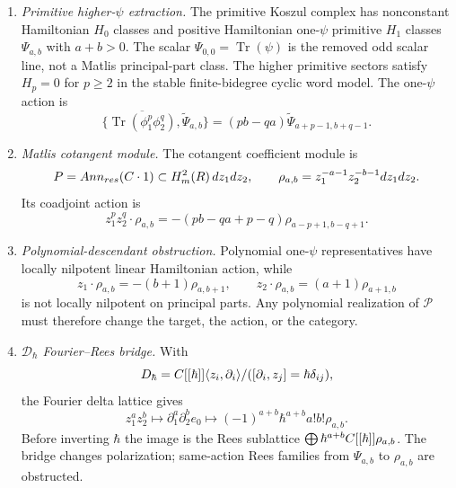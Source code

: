 \begin{enumerate}
  \item \emph{Primitive higher-\(\psi\) extraction.}
  The primitive Koszul complex has nonconstant Hamiltonian \(H_0\)
  classes and positive Hamiltonian one-\(\psi\) primitive \(H_1\)
  classes \(\Psi_{a,b}\) with \(a+b>0\).  The scalar
  \(\Psi_{0,0}=\operatorname{Tr}(\psi)\) is the removed odd scalar line,
  not a Matlis principal-part class.  The higher primitive sectors
  satisfy \(H_p=0\) for \(p\ge2\) in the stable finite-bidegree cyclic
  word model.  The
  one-\(\psi\) action is
  \[
    \{\overline{\operatorname{Tr}(\phi_1^p\phi_2^q)},
      \widetilde\Psi_{a,b}\}
    =(pb-qa)\widetilde\Psi_{a+p-1,b+q-1}.
  \]

  \item \emph{Matlis cotangent module.}
  The cotangent coefficient module is
  \[
    P=
    Ann_{res}(C\cdot1)
    \subset H^2_{m}(R)\,dz_1dz_2,
    \qquad
    \rho_{a,b}=z_1^{-a-1}z_2^{-b-1}dz_1dz_2 .
  \]
  Its coadjoint action is
  \[
    z_1^pz_2^q\cdot\rho_{a,b}
    =-(pb-qa+p-q)\rho_{a-p+1,b-q+1}.
  \]

  \item \emph{Polynomial-descendant obstruction.}
  Polynomial one-\(\psi\) representatives have locally nilpotent linear
  Hamiltonian action, while
  \[
    z_1\cdot\rho_{a,b}=-(b+1)\rho_{a,b+1},\qquad
    z_2\cdot\rho_{a,b}=(a+1)\rho_{a+1,b}
  \]
  is not locally nilpotent on principal parts.  Any polynomial
  realization of \(\mathcal P\) must therefore change the target, the
  action, or the category.

  \item \emph{\(\mathcal D_\hbar\) Fourier--Rees bridge.}
  With
  \[
    D_\hbar=
    C[[\hbar]]\langle z_i,\partial_i\rangle/
    ([\partial_i,z_j]=\hbar\delta_{ij}),
  \]
  the Fourier delta lattice gives
  \[
    z_1^az_2^b\mapsto\partial_1^a\partial_2^be_0
    \mapsto(-1)^{a+b}\hbar^{a+b}a!b!\rho_{a,b}.
  \]
  Before inverting \(\hbar\) the image is the Rees sublattice
  \(\bigoplus\hbar^{a+b}C[[\hbar]]\rho_{a,b}\).  The bridge changes
  polarization; same-action Rees families from \(\Psi_{a,b}\) to
  \(\rho_{a,b}\) are obstructed.


\end{enumerate}
